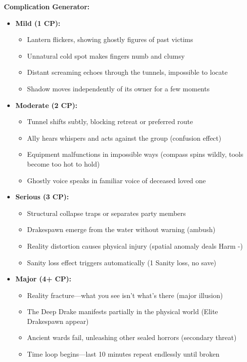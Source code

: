 \documentclass[11pt]{article}
\begin{document}
\textbf{Complication Generator:}
\begin{itemize}
\item \textbf{Mild (1 CP):} 
  \begin{itemize}
  \item Lantern flickers, showing ghostly figures of past victims
  \item Unnatural cold spot makes fingers numb and clumsy
  \item Distant screaming echoes through the tunnels, impossible to locate
  \item Shadow moves independently of its owner for a few moments
  \end{itemize}
\item \textbf{Moderate (2 CP):}
  \begin{itemize}
  \item Tunnel shifts subtly, blocking retreat or preferred route
  \item Ally hears whispers and acts against the group (confusion effect)
  \item Equipment malfunctions in impossible ways (compass spins wildly, tools become too hot to hold)
  \item Ghostly voice speaks in familiar voice of deceased loved one
  \end{itemize}
\item \textbf{Serious (3 CP):}
  \begin{itemize}
  \item Structural collapse traps or separates party members
  \item Drakespawn emerge from the water without warning (ambush)
  \item Reality distortion causes physical injury (spatial anomaly deals Harm -)
  \item Sanity loss effect triggers automatically (1 Sanity loss, no save)
  \end{itemize}
\item \textbf{Major (4+ CP):}
  \begin{itemize}
  \item Reality fracture—what you see isn't what's there (major illusion)
  \item The Deep Drake manifests partially in the physical world (Elite Drakespawn appear)
  \item Ancient wards fail, unleashing other sealed horrors (secondary threat)
  \item Time loop begins—last 10 minutes repeat endlessly until broken
  \end{itemize}
\end{itemize}
\end{document}
